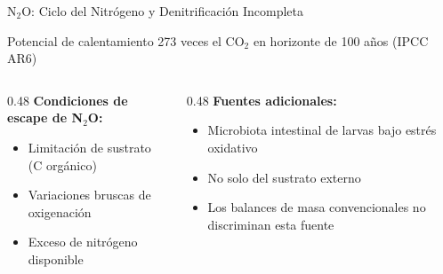 \documentclass[aspectratio=169, 11pt]{beamer}
\begin{document}
\begin{frame}{N$_2$O: Ciclo del Nitrógeno y Denitrificación Incompleta}
\begin{block}{Potencial de calentamiento}
273 veces el CO$_2$ en horizonte de 100 años (IPCC AR6)
\end{block}
\vspace{0.2cm}
\begin{center}
\end{center}
\vspace{0.3cm}
\begin{columns}[T]
\begin{column}{0.48\textwidth}
\textbf{Condiciones de escape de N$_2$O:}
\begin{itemize}
    \item Limitación de sustrato (C orgánico)
    \item Variaciones bruscas de oxigenación
    \item Exceso de nitrógeno disponible
\end{itemize}
\end{column}
\begin{column}{0.48\textwidth}
\textbf{Fuentes adicionales:}
\begin{itemize}
    \item Microbiota intestinal de larvas bajo estrés oxidativo
    \item No solo del sustrato externo
    \item Los balances de masa convencionales no discriminan esta fuente
\end{itemize}
\end{column}
\end{columns}
\end{frame}
\end{document}
